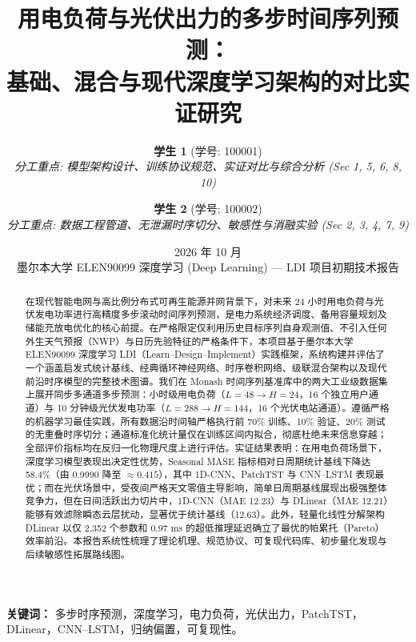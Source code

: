 \documentclass[11pt,a4paper,UTF8]{ctexart}
\title{\textbf{用电负荷与光伏出力的多步时间序列预测：\\基础、混合与现代深度学习架构的对比实证研究}}
\author{
    \textbf{学生 1} (学号: 100001) \\
    \textit{分工重点: 模型架构设计、训练协议规范、实证对比与综合分析 (Sec 1, 5, 6, 8, 10)} \\
    \and
    \textbf{学生 2} (学号: 100002) \\
    \textit{分工重点: 数据工程管道、无泄漏时序切分、敏感性与消融实验 (Sec 2, 3, 4, 7, 9)}
}
\date{2026 年 10 月 \\ \vspace{0.5em} \small 墨尔本大学 ELEN90099 深度学习 (Deep Learning) --- LDI 项目初期技术报告}
\begin{document}
\maketitle

\begin{abstract}
在现代智能电网与高比例分布式可再生能源并网背景下，对未来 24 小时用电负荷与光伏发电功率进行高精度多步滚动时间序列预测，是电力系统经济调度、备用容量规划及储能充放电优化的核心前提。在严格限定仅利用历史目标序列自身观测值、不引入任何外生天气预报（NWP）与日历先验特征的严格条件下，本项目基于墨尔本大学 ELEN90099 深度学习 LDI（Learn--Design--Implement）实践框架，系统构建并评估了一个涵盖启发式统计基线、经典循环神经网络、时序卷积网络、级联混合架构以及现代前沿时序模型的完整技术图谱。我们在 Monash 时间序列基准库中的两大工业级数据集上展开同步多通道多步预测：小时级用电负荷（$L=48 \to H=24$，16 个独立用户通道）与 10 分钟级光伏发电功率（$L=288 \to H=144$，16 个光伏电站通道）。遵循严格的机器学习最佳实践，所有数据沿时间轴严格执行前 70\% 训练、10\% 验证、20\% 测试的无重叠时序切分；通道标准化统计量仅在训练区间内拟合，彻底杜绝未来信息穿越；全部评价指标均在反归一化物理尺度上进行评估。实证结果表明：在用电负荷场景下，深度学习模型表现出决定性优势，Seasonal MASE 指标相对日周期统计基线下降达 58.4\%（由 0.9990 降至 $\approx 0.415$），其中 1D-CNN、PatchTST 与 CNN--LSTM 表现最优；而在光伏场景中，受夜间严格天文零值主导影响，简单日周期基线展现出极强整体竞争力，但在日间活跃出力切片中，1D-CNN（MAE 12.23）与 DLinear（MAE 12.21）能够有效滤除瞬态云层扰动，显著优于统计基线（12.63）。此外，轻量化线性分解架构 DLinear 以仅 2,352 个参数和 0.97 ms 的超低推理延迟确立了最优的帕累托（Pareto）效率前沿。本报告系统性梳理了理论机理、规范协议、可复现代码库、初步量化发现与后续敏感性拓展路线图。
\end{abstract}

\vspace{0.3em}
\noindent\textbf{关键词：} 多步时序预测，深度学习，电力负荷，光伏出力，PatchTST，DLinear，CNN--LSTM，归纳偏置，可复现性。
\end{document}
